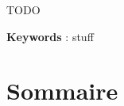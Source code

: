 TODO

\quad

\textbf{Keywords} : stuff




\cleardoublepage
\dominitoc
\makeatletter
\renewcommand{\contentsname}{Sommaire}
\renewcommand{\tableofcontents}[1][\contentsname]{%
  \chapter*{#1}
}
\makeatother
\tableofcontents

